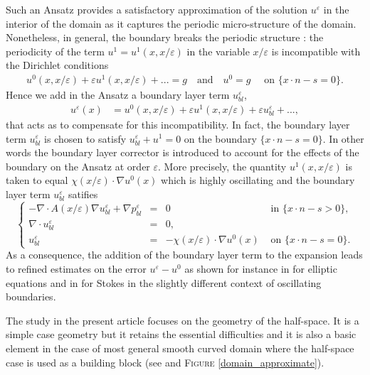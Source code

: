 \documentclass[11pt, reqno]{amsart}
\theoremstyle{definition}
\theoremstyle{remark}
\numberwithin{equation}{section}
\begin{document}
	\noindent 	Such an Ansatz provides a satisfactory approximation of the solution $u^\varepsilon$ in the interior of the domain as it  captures the periodic micro-structure of the domain. Nonetheless, in general, the boundary breaks the periodic structure : the periodicity of the term $u^1=u^1(x,x/\varepsilon)$ in the variable $x/\varepsilon$  is incompatible with the Dirichlet conditions
	\begin{align*}
		u^0(x,x/\varepsilon)+ \varepsilon
		u^1(x,x/\varepsilon)+...=g\quad  \mbox{and}\quad u^0=g \quad \mbox{ on } \{x\cdot n-s=0\}.
	\end{align*}
	Hence we add in the Ansatz a boundary layer term $u_{bl}^\varepsilon$,
	\begin{align*}
		u^\varepsilon(x)&=u^0(x,x/\varepsilon)+ \varepsilon
		u^1(x,x/\varepsilon)+  \varepsilon u_{bl}^\varepsilon + ...,
	\end{align*}
	that acts as to compensate for this incompatibility. In fact, the boundary layer term $u_{bl}^\varepsilon$ is chosen to satisfy $u_{bl}^\varepsilon + u^1=0$ on the boundary $ \{x\cdot n-s=0\}$.  In other words the boundary layer corrector is introduced to account for the effects of the boundary on the Ansatz at order $\varepsilon$. More precisely, the quantity $u^1(x,x/\varepsilon)$ is taken to equal $	\chi (x/\varepsilon)\cdot  \nabla u^0(x)$ which is highly oscillating and the boundary layer term 	$u_{bl}^\varepsilon$ satifies 
	\begin{equation*}
		\left\{
		\begin{array}{rcll}
			-\nabla\cdot A (x/\varepsilon ) \nabla u_{bl}^\varepsilon +  \nabla p_{bl}^\varepsilon&=& 0\; & \mbox{ in } \{ x\cdot n-s>0 \},\\
			\nabla\cdot u_{bl}^\varepsilon&=& 0,\; &\\
			u_{bl}^\varepsilon&=&-\chi (x/\varepsilon)\cdot  \nabla u^0(x)  & \mbox{ on }  \{x\cdot n-s=0\}.
		\end{array}
		\right. 
	\end{equation*} 
	As a consequence, the addition of the boundary layer term to the expansion  leads to refined estimates on the error $u^\varepsilon- u^0$ as shown for instance in \cite{AA,homogen_polygon} for elliptic equations and in \cite{Slip_cond} for Stokes in the slightly different context of oscillating boundaries.
	
	The study in the present article focuses on the geometry of the half-space. It is a simple case geometry but it retains the essential difficulties and it is also a basic element in the case of most general smooth curved domain where the half-space case is used as a building block (see \cite{AKMP,homogen_bl} and \textsc{Figure} \ref{domain_approximate}).
	
\end{document}
